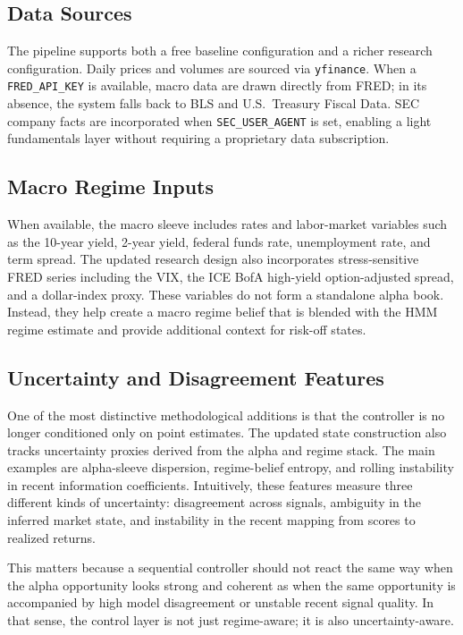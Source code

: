 \documentclass[10pt,twocolumn]{article}
\begin{document}
\subsection{Data Sources}

The pipeline supports both a free baseline configuration and a richer research
configuration. Daily prices and volumes are sourced via \texttt{yfinance}. When a
\texttt{FRED\_API\_KEY} is available, macro data are drawn directly from FRED; in
its absence, the system falls back to BLS and U.S.\ Treasury Fiscal Data. SEC
company facts are incorporated when \texttt{SEC\_USER\_AGENT} is set, enabling a
light fundamentals layer without requiring a proprietary data subscription.

\subsection{Macro Regime Inputs}

When available, the macro sleeve includes rates and labor-market variables such
as the 10-year yield, 2-year yield, federal funds rate, unemployment rate, and
term spread. The updated research design also incorporates stress-sensitive FRED
series including the VIX, the ICE BofA high-yield option-adjusted spread, and a
dollar-index proxy. These variables do not form a standalone alpha book.
Instead, they help create a macro regime belief that is blended with the HMM
regime estimate and provide additional context for risk-off states.

\subsection{Uncertainty and Disagreement Features}

One of the most distinctive methodological additions is that the controller is
no longer conditioned only on point estimates. The updated state construction
also tracks uncertainty proxies derived from the alpha and regime stack. The
main examples are alpha-sleeve dispersion, regime-belief entropy, and rolling
instability in recent information coefficients. Intuitively, these features
measure three different kinds of uncertainty: disagreement across signals,
ambiguity in the inferred market state, and instability in the recent mapping
from scores to realized returns.

This matters because a sequential controller should not react the same way when
the alpha opportunity looks strong and coherent as when the same opportunity is
accompanied by high model disagreement or unstable recent signal quality. In
that sense, the control layer is not just regime-aware; it is also
uncertainty-aware.
\end{document}
